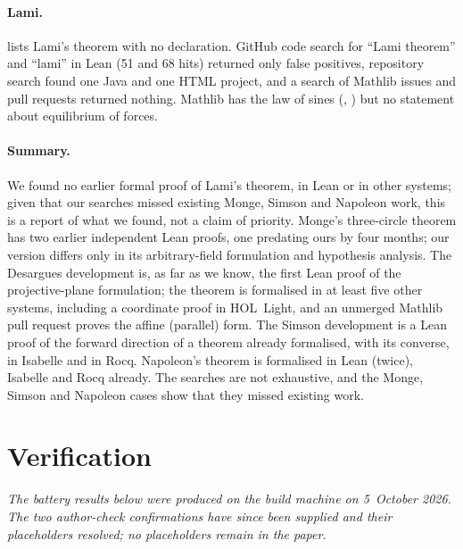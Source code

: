 \documentclass[11pt]{article}
\theoremstyle{definition}
\theoremstyle{remark}
\begin{document}
\paragraph{Lami.}  lists Lami's theorem with no declaration. GitHub code
search for ``Lami theorem'' and ``lami'' in Lean (51 and 68 hits) returned only false positives,
repository search found one Java and one HTML project, and a search of Mathlib issues and pull
requests returned nothing. Mathlib has the law of sines
(, )
but no statement about equilibrium of forces.

\paragraph{Summary.} We found no earlier formal proof of Lami's theorem, in Lean or in other
systems; given that our searches missed existing Monge, Simson and Napoleon work, this is a report
of what we found, not a claim of priority. Monge's three-circle theorem has two earlier
independent Lean proofs, one predating ours by four months; our version differs only in its
arbitrary-field formulation and hypothesis analysis. The Desargues
development is, as far as we know, the first Lean proof of the projective-plane formulation; the
theorem is formalised in at least five other systems, including a coordinate proof in HOL~Light,
and an unmerged Mathlib pull request proves the affine (parallel) form. The Simson development is
a Lean proof of the forward direction of a theorem already formalised, with its converse, in
Isabelle and in Rocq. Napoleon's theorem is formalised in Lean (twice), Isabelle and Rocq
already. The searches are not exhaustive, and the Monge, Simson and Napoleon cases show that they
missed existing work.

\section{Verification}\label{sec:verify}

\emph{The battery results below were produced on the build machine on 5~October 2026. The two
author-check confirmations have since been supplied and their placeholders resolved; no
placeholders remain in the paper.}
\end{document}
